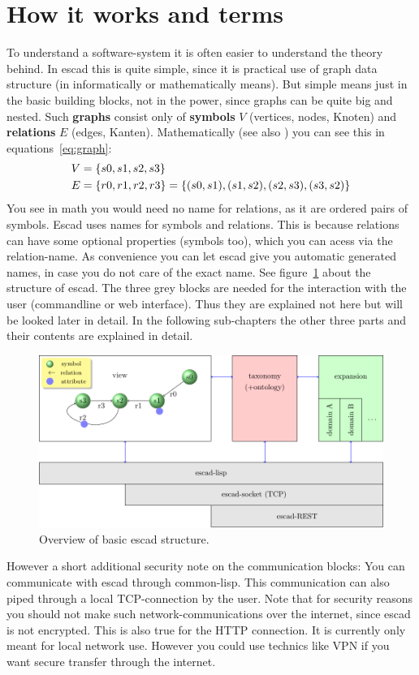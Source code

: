 \documentclass[a4paper, 12pt, openany]{scrbook}
\begin{document}
\section{How it works and terms}
To understand a software-system it is often easier to understand the theory behind. In escad this is quite simple, since it is practical use of graph data structure (in informatically or mathematically means). But simple means just in the basic building blocks, not in the power, since graphs can be quite big and nested. Such \textbf{graphs} consist only of \textbf{symbols} $V$ (vertices, nodes, Knoten) and \textbf{relations} $E$ (edges, Kanten). Mathematically (see also \cite{math:taschenbuchdermathematik}) you can see this in equations~\ref{eq:graph}:
\begin{align}
  \label{eq:graph}
  V & = \{s0, s1, s2, s3\} \notag \\
  E & = \{r0, r1, r2, r3\} = \{(s0, s1), (s1, s2), (s2, s3), (s3, s2)\}
\end{align}
You see in math you would need no name for relations, as it are ordered pairs of symbols. Escad uses names for symbols and relations. This is because relations can have some optional properties (symbols too), which you can acess via the relation-name. As convenience you can let escad give you automatic generated names, in case you do not care of the exact name.
See figure~\ref{fig:overview} about the structure of escad. The three grey blocks are needed for the interaction with the user (commandline or web interface). Thus they are explained not here but will be looked later in detail. In the following sub-chapters the other three parts and their contents are explained in detail.
\begin{figure}[htbp]
  \centering
  \includegraphics{figures/overview.pdf}
  \caption{Overview of basic escad structure.}
  \label{fig:overview}
\end{figure}
However a short additional security note on the communication blocks: You can communicate with escad through common-lisp. This communication can also piped through a local TCP-connection by the user. Note that for security reasons you should not make such network-communications over the internet, since escad is not encrypted. This is also true for the HTTP connection. It is currently only meant for local network use. However you could use technics like VPN if you want secure transfer through the internet.
\end{document}
